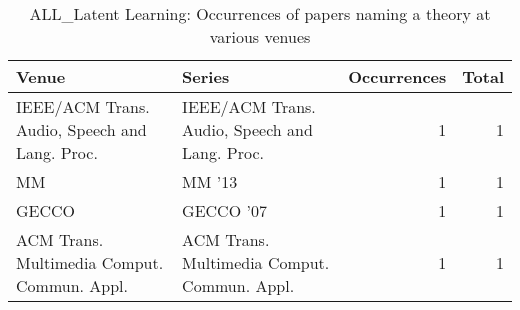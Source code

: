 \begin{table*}[t]
\begin{tabular}{llrr}
Venue & Series & Occurrences & Total\\\hline
\multirow{1}{*}{IEEE/ACM Trans. Audio, Speech and Lang. Proc.} & IEEE/ACM Trans. Audio, Speech and Lang. Proc. & 1 & \multirow{1}{*}{1}\\
\multirow{1}{*}{MM } & MM '13 & 1 & \multirow{1}{*}{1}\\
\multirow{1}{*}{GECCO } & GECCO '07 & 1 & \multirow{1}{*}{1}\\
\multirow{1}{*}{ACM Trans. Multimedia Comput. Commun. Appl.} & ACM Trans. Multimedia Comput. Commun. Appl. & 1 & \multirow{1}{*}{1}\\
\end{tabular}
\caption{ALL\_Latent Learning: Occurrences of papers naming a theory at various venues}
\end{table*}